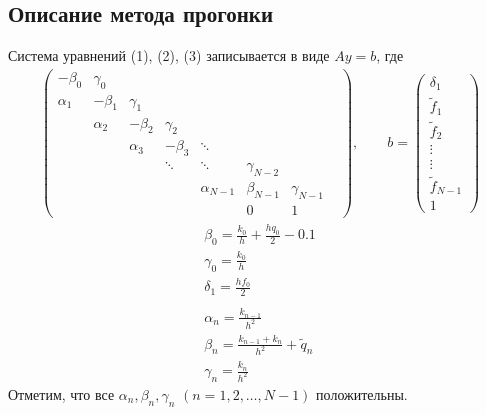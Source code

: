 \documentclass[titlepage]{article}
\begin{document}
\subsection{Описание метода прогонки}
Система уравнений (1), (2), (3) записывается в виде $Ay = b$, где 
\begin{gather}
	\begin{pmatrix}
		-\beta_0 & \gamma_0 & & & & & \\
		\alpha_1 & -\beta_1 & \gamma_1 & & & & \\
		& \alpha_2 & -\beta_2 & \gamma_2 & & & \\
		& & \alpha_3 & -\beta_3 & \ddots & & & \\
		& & & \ddots & \ddots & \gamma_{N-2} & & \\
		& & & & \alpha_{N-1} & \beta_{N-1} & \gamma_{N-1} \\
		& & & & & 0 & 1
	\end{pmatrix}
	, \qquad b = 
	\begin{pmatrix}
		\delta_1 \\ \tilde f_1 \\ \tilde f_2 \\ \vdots \\ \vdots \\ \tilde f_{N-1} \\ 1
	\end{pmatrix}	
\end{gather}
\begin{gather*}
	\beta_0 = \frac{k_0}{h} + \frac{hq_0}{2} - 0.1\\
	\gamma_0 = \frac{k_0}{h} \\
	\delta_1 = \frac{hf_0}{2} \\
	\\
	\alpha_n = \frac{k_{n-1}}{h^2} \\ 
	\beta_n = \frac{k_{n-1} + k_n}{h^2} + \tilde q_n \\
	\gamma_n = \frac{k_n}{h^2}
\end{gather*}
Отметим, что все $\alpha_n, \beta_n, \gamma_n$ $(n = 1,2,\dots,N-1)$ положительны. 
\end{document}
